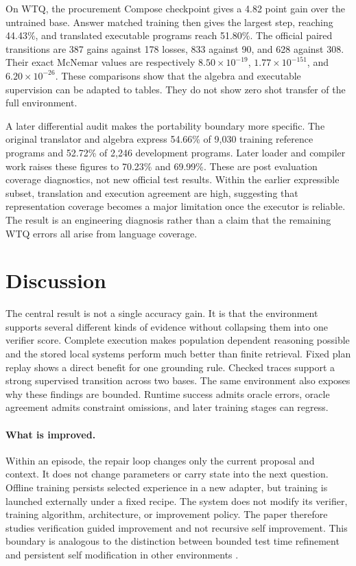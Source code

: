 \documentclass{article}
\begin{document}
On WTQ, the procurement Compose checkpoint gives a 4.82 point gain over the untrained base.  Answer
matched training then gives the largest step, reaching 44.43\%, and translated executable programs
reach 51.80\%.  The official paired transitions are 387 gains against 178 losses,
833 against 90, and 628 against 308.  Their exact McNemar values are respectively
$8.50\times10^{-19}$, $1.77\times10^{-151}$, and $6.20\times10^{-26}$.  These comparisons show
that the algebra and executable supervision can be adapted to tables.  They do not show zero shot
transfer of the full environment.

A later differential audit makes the portability boundary more specific.  The original translator
and algebra express 54.66\% of 9,030 training reference programs and 52.72\% of 2,246 development
programs.  Later loader and compiler work raises these figures to 70.23\% and 69.99\%.  These are
post evaluation coverage diagnostics, not new official test results.  Within the earlier
expressible subset, translation and execution agreement are high, suggesting that representation
coverage becomes a major limitation once the executor is reliable.  The result is an engineering
diagnosis rather than a claim that the remaining WTQ errors all arise from language coverage.

\section{Discussion}
\label{sec:discussion}

The central result is not a single accuracy gain.  It is that the environment supports several
different kinds of evidence without collapsing them into one verifier score.  Complete execution
makes population dependent reasoning possible and the stored local systems perform much better
than finite retrieval.  Fixed plan replay shows a direct benefit for one grounding rule.  Checked
traces support a strong supervised transition across two bases.  The same environment also exposes
why these findings are bounded.  Runtime success admits oracle errors, oracle agreement admits
constraint omissions, and later training stages can regress.

\paragraph{What is improved.}
Within an episode, the repair loop changes only the current proposal and context.  It does not
change parameters or carry state into the next question.  Offline training persists selected
experience in a new adapter, but training is launched externally under a fixed recipe.  The system
does not modify its verifier, training algorithm, architecture, or improvement policy.  The paper
therefore studies verification guided improvement and not recursive self improvement.  This
boundary is analogous to the distinction between bounded test time refinement and persistent self
modification in other environments \citep{tan2026tangramsr,mishra2026aie}.
\end{document}
